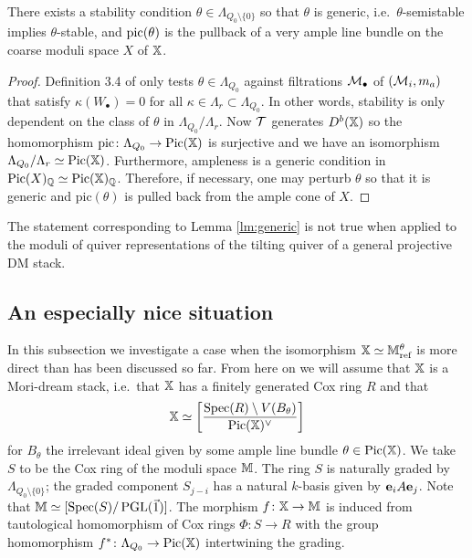 \documentclass[12pt]{amsart}
\begin{document}
\begin{lemma}\label{lm:generic}
There exists a stability condition $\theta \in \Lambda_{{Q_0}\setminus \{0\}}$ so that $\theta$ is generic, i.e.\ $\theta$-semistable implies $\theta$-stable, and $\textup{pic}(\theta)$ is the pullback of a very ample line bundle on the coarse moduli space $X$ of $\mathbb{X}$.
\end{lemma}

\begin{proof}
Definition 3.4 of \cite{Abd} only tests $\theta \in \Lambda_{Q_0}$ against filtrations $\mathcal{M}_\bullet$ of $(\mathcal{M}_i, m_a)$ that satisfy $\kappa(W_\bullet)=0$ for all $\kappa\in \Lambda_r \subset \Lambda_{Q_0}$.
In other words, stability is only dependent on the class of $\theta$ in $\Lambda_{Q_0}/\Lambda_r$.
Now $\mathcal{T}$ generates $D^b(\mathbb{X})$ so the homomorphism $\text{pic}\colon \Lambda_{Q_0} \rightarrow \operatorname{Pic}(\mathbb{X})$ is surjective and we have an isomorphism $\Lambda_{Q_0}/\Lambda_r \simeq \operatorname{Pic}(\mathbb{X})$.
Furthermore, ampleness is a generic condition in $\operatorname{Pic}(X)_{\mathbb{Q}} \simeq \operatorname{Pic}(\mathbb{X})_{\mathbb{Q}}$.
Therefore, if necessary, one may perturb $\theta$ so that it is generic and $\text{pic}(\theta)$ is pulled back from the ample cone of $X$.
\end{proof}

\begin{remark}\label{rm:generic}
The statement corresponding to Lemma \ref{lm:generic} is not true when applied to the moduli of quiver representations of the tilting quiver of a general projective DM stack.
\end{remark}

\subsection{An especially nice situation}
In this subsection we investigate a case when the isomorphism $\mathbb{X} \simeq \mathbb{M}_\text{ref}^\theta$ is more direct than has been discussed so far.
From here on we will assume that $\mathbb{X}$ is a Mori-dream stack, i.e.\ that $\mathbb{X}$ has a finitely generated Cox ring $R$ and that $$\mathbb{X} \simeq \bigg[\frac{\operatorname{Spec}(R) \setminus V(B_\theta)}{\operatorname{Pic}(\mathbb{X})^\vee}\bigg]$$ for $B_\theta$ the irrelevant ideal given by some ample line bundle $\theta \in \operatorname{Pic}(\mathbb{X})$.
We take $S$ to be the Cox ring of the moduli space $\mathbb{M}$. The ring $S$ is naturally graded by $\Lambda_{Q_0\setminus\{0\}}$; the graded component $S_{j-i}$ has a natural $k$-basis given by $\mathbf{e}_i A \mathbf{e}_j$.
Note that $\mathbb{M} \simeq [\operatorname{Spec}(S)/\operatorname{PGL}(\vec{1})]$. 
The morphism $f \colon \mathbb{X} \rightarrow \mathbb{M}$ is induced from tautological homomorphism of Cox rings $\Phi \colon S \rightarrow R$ with the group homomorphism $f^* \colon \Lambda_{Q_0} \rightarrow \operatorname{Pic}(\mathbb{X})$ intertwining the grading.
\end{document}

